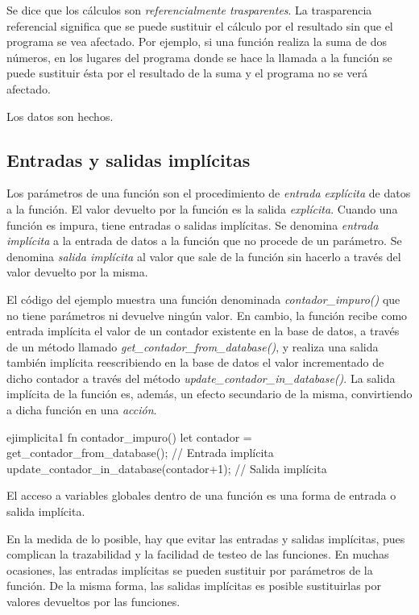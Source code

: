 Se dice que los cálculos son \textit{referencialmente trasparentes}. La trasparencia referencial significa que se puede sustituir el cálculo por el resultado sin que el programa se vea afectado. Por ejemplo, si una función realiza la suma de dos números, en los lugares del programa donde se hace la llamada a la función se puede sustituir ésta por el resultado de la suma y el programa no se verá afectado.

Los datos son hechos.

\subsection{Entradas y salidas implícitas}
Los parámetros de una función son el procedimiento de \textit{entrada explícita} de datos a la función. El valor devuelto por la función es la salida \textit{explícita}. 
Cuando una función es impura, tiene entradas o salidas implícitas. Se denomina \textit{entrada implícita} a la entrada de datos a la función que no procede de un parámetro. Se denomina \textit{salida implícita} al valor que sale de la función sin hacerlo a través del valor devuelto por la misma.

El código del ejemplo muestra una función denominada \textit{contador\_impuro()} que no tiene parámetros ni devuelve ningún valor. En cambio, la función recibe como entrada implícita el valor de un contador existente en la base de datos, a través de un método llamado \textit{get\_contador\_from\_database()}, y realiza una salida también implícita reescribiendo en la base de datos el valor incrementado de dicho contador a través del método \textit{update\_contador\_in\_database()}. La salida implícita de la función es, además, un efecto secundario de la misma, convirtiendo a dicha función en una \textit{acción}.

\begin{EjemploCodigo}{ejimplicita1}
   fn contador_impuro() {
      let contador = get_contador_from_database(); // Entrada implícita
      update_contador_in_database(contador+1); // Salida implícita
   }
\end{EjemploCodigo}

El acceso a variables globales dentro de una función es una forma de entrada o salida implícita.

En la medida de lo posible, hay que evitar las entradas y salidas implícitas, pues complican la trazabilidad y la facilidad de testeo de las funciones. En muchas ocasiones, las entradas implícitas se pueden sustituir por parámetros de la función. De la misma forma, las salidas implícitas es posible sustituirlas por valores devueltos por las funciones.



